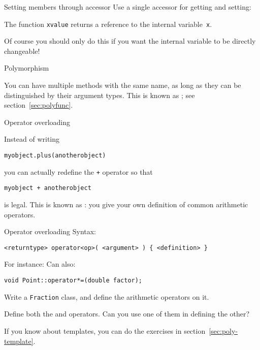 \begin{block}{Setting members through accessor}
  \label{sl:setmember}
  Use a single accessor for getting and setting:

  The function \lstinline{xvalue} returns a reference to the internal
  variable~\lstinline{x}.
\end{block}

Of course you should only do this if you want the internal variable to
be directly changeable!

 {Polymorphism}

You can have multiple methods with the same name, as long as they can
be distinguished by their argument types. This is known as ;
see section~\ref{sec:polyfunc}.

 {Operator overloading}
\label{sec:operatordef}

Instead of writing 
\begin{lstlisting}
myobject.plus(anotherobject)
\end{lstlisting}
you can actually redefine the \lstinline{+} operator so that
\begin{lstlisting}
myobject + anotherobject
\end{lstlisting}
is legal. This is known as :
you give your own definition of common arithmetic operators.

\begin{block}{Operator overloading}
  \label{sl:object-operator}
  Syntax:
\begin{lstlisting}
<returntype> operator<op>( <argument> ) { <definition> }
\end{lstlisting}
For instance:
%
%
Can also:
\begin{lstlisting}
void Point::operator*=(double factor);
\end{lstlisting}
\end{block}

\begin{exercise}
  Write a \lstinline{Fraction} class, and define the arithmetic operators on it.

  Define both the \n{+} and \n{+=} operators. Can you use one of them
  in defining the other?
\end{exercise}
\begin{exercise}
  If you know about templates, you can do the exercises in section~\ref{sec:poly-template}.
\end{exercise}

